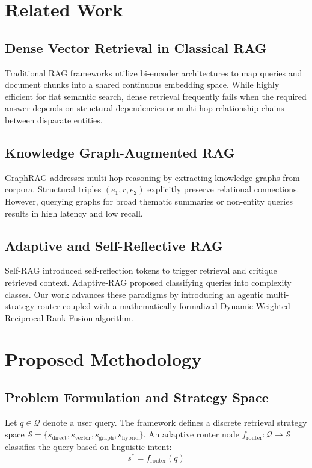 \documentclass[conference]{IEEEtran}
\begin{document}
\section{Related Work}
\subsection{Dense Vector Retrieval in Classical RAG}
Traditional RAG frameworks \cite{lewis2020retrieval, reimers2019sentence} utilize bi-encoder architectures to map queries and document chunks into a shared continuous embedding space. While highly efficient for flat semantic search, dense retrieval frequently fails when the required answer depends on structural dependencies or multi-hop relationship chains between disparate entities.

\subsection{Knowledge Graph-Augmented RAG}
GraphRAG \cite{edge2024graphrag} addresses multi-hop reasoning by extracting knowledge graphs from corpora. Structural triples $(e_1, r, e_2)$ explicitly preserve relational connections. However, querying graphs for broad thematic summaries or non-entity queries results in high latency and low recall.

\subsection{Adaptive and Self-Reflective RAG}
Self-RAG \cite{asai2023selfrag} introduced self-reflection tokens to trigger retrieval and critique retrieved context. Adaptive-RAG \cite{jeong2024adaptive} proposed classifying queries into complexity classes. Our work advances these paradigms by introducing an agentic multi-strategy router coupled with a mathematically formalized Dynamic-Weighted Reciprocal Rank Fusion algorithm.

\section{Proposed Methodology}

\subsection{Problem Formulation and Strategy Space}
Let $q \in \mathcal{Q}$ denote a user query. The framework defines a discrete retrieval strategy space $\mathcal{S} = \{s_{\text{direct}}, s_{\text{vector}}, s_{\text{graph}}, s_{\text{hybrid}}\}$. An adaptive router node $f_{\text{router}}: \mathcal{Q} \to \mathcal{S}$ classifies the query based on linguistic intent:
\begin{equation}
s^* = f_{\text{router}}(q)
\end{equation}
\end{document}
